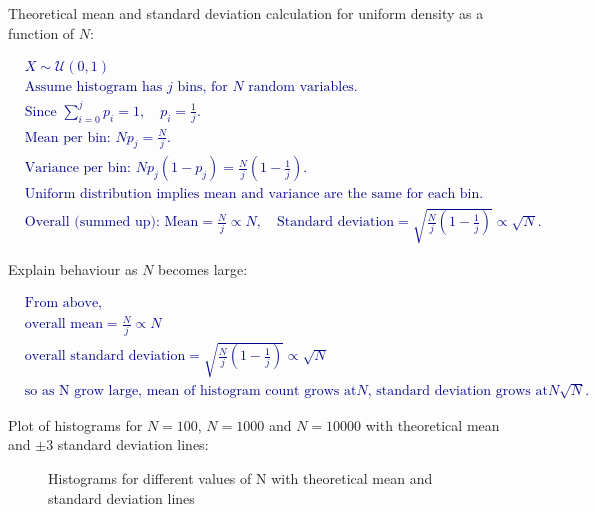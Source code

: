 \documentclass[12pt]{article}
\begin{document}
\begin{enumerate}
Theoretical  mean and standard deviation calculation for uniform density as a function of $N$:
\textcolor{darkblue}{
    \begin{flushleft} %
        \begin{align*}
            & X \sim \mathcal{U}(0,1) \\
            & \text{Assume histogram has } j \text{ bins, for } N \text{ random variables.} \\
            & \text{Since } \sum_{i=0}^{j} p_i = 1, \quad p_i = \frac{1}{j}. \\
            & \text{Mean per bin: } N p_j = \frac{N}{j}. \\
            & \text{Variance per bin: } N p_j (1 - p_j) = \frac{N}{j} \left( 1 - \frac{1}{j} \right). \\
            & \text{Uniform distribution implies mean and variance are the same for each bin.} \\
            & \text{Overall (summed up): } \text{Mean} = \frac{N}{j} \propto N, \quad \text{Standard deviation} = \sqrt{\frac{N}{j} \left( 1 - \frac{1}{j} \right)} \propto \sqrt{N}.
        \end{align*}
    \end{flushleft}
}
\vspace{2in}

Explain behaviour as $N$ becomes large:
\textcolor{darkblue}{
    \begin{flushleft} %
        \begin{align*}
            & \text{From above, }\\ 
            & \text{overall mean}=\frac{N}{j}\propto N\\
            & \text{overall standard deviation}=\sqrt{\frac{N}{j}(1-\frac{1}{j})}\propto \sqrt{N}\\
            & \text{so as N grow large, mean of histogram count grows at}N\text{, standard deviation grows at}N\sqrt{N}\text{.}
        \end{align*}
    \end{flushleft}
}
\vspace{3in}



Plot of histograms for $N=100$,  $N=1000$ and $N=10000$ with theoretical mean  and $\pm 3$ standard deviation lines:
\begin{figure}[htbp]
    \centering
    \caption{Histograms for different values of N with theoretical mean and standard deviation lines}
    \label{fig:q1_5}
\end{figure}
\vspace{3in}


\end{enumerate}
\end{document}
